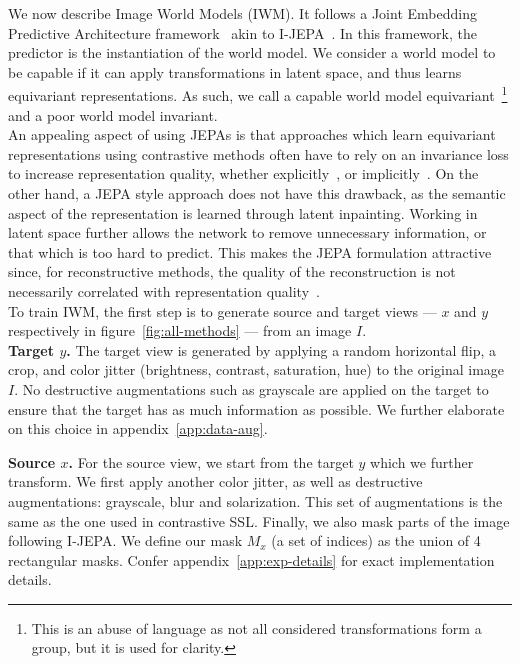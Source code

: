 \documentclass[twocolumn]{fairmeta}
\theoremstyle{plain}
\theoremstyle{definition}
\theoremstyle{remark}
\begin{document}
We now describe Image World Models (IWM). It follows a Joint Embedding Predictive Architecture framework~\citep{lecun2022AMI} akin to I-JEPA~\citep{assran2023ijepa}. In this framework, the predictor is the instantiation of the world model. We consider a world model to be capable if it can apply transformations in latent space, and thus learns equivariant representations. As such, we call a capable world model equivariant~\footnote{This is an abuse of language as not all considered transformations form a group, but it is used for clarity.} and a poor world model invariant.\\
An appealing aspect of using JEPAs is that approaches which learn equivariant representations using contrastive methods often have to rely on an invariance loss to increase representation quality, whether explicitly~\citep{gupta2023care,garrido2023sie}, or implicitly~\citep{chavhan2023diversity}. On the other hand, a JEPA style approach does not have this drawback, as the semantic aspect of the representation is learned through latent inpainting.
Working in latent space further allows the network to remove unnecessary information, or that which is too hard to predict. This makes the JEPA formulation attractive since, for reconstructive methods, the quality of the reconstruction is not necessarily correlated with representation quality~\cite{chen2024dae}. \\
To train IWM, the first step is to generate source and target views --- $x$ and $y$ respectively in figure~\ref{fig:all-methods} --- from an image $I$.\\

\textbf{Target $y$.} The target view is generated by applying a random horizontal flip, a crop, and color jitter (brightness, contrast, saturation, hue) to the original image $I$. No destructive augmentations such as grayscale are applied on the target to ensure that the target has as much information as possible. We further elaborate on this choice in appendix~\ref{app:data-aug}.

\textbf{Source $x$.} For the source view, we start from the target $y$ which we further transform. We first apply another color jitter, as well as destructive augmentations: grayscale, blur and solarization. This set of augmentations is the same as the one used in contrastive SSL. Finally, we also mask parts of the image following I-JEPA. We define our mask $M_x$ (a set of indices) as the union of 4 rectangular masks. Confer appendix~\ref{app:exp-details} for exact implementation details.
\end{document}

